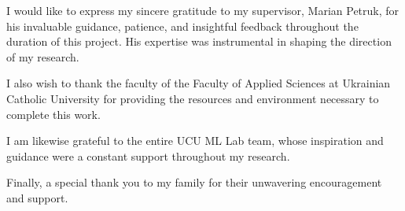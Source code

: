 \documentclass[
11pt, %
oneside, %
ukrainian,
english, %
singlespacing, %
headsepline, %
]{BachelorMasterThesis} %
\begin{document}
\begin{acknowledgements}
\addchaptertocentry{\acknowledgementname} %
I would like to express my sincere gratitude to my supervisor, Marian Petruk, for his invaluable guidance, patience, and insightful feedback throughout the duration of this project. His expertise was instrumental in shaping the direction of my research.

I also wish to thank the faculty of the Faculty of Applied Sciences at Ukrainian Catholic University for providing the resources and environment necessary to complete this work.

I am likewise grateful to the entire UCU ML Lab team, whose inspiration and guidance were a constant support throughout my research.

Finally, a special thank you to my family for their unwavering encouragement and support.
\end{acknowledgements}


\tableofcontents %

\listoffigures %

\listoftables %

\end{document}
